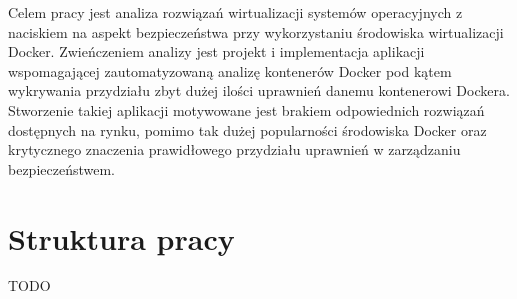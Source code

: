Celem pracy jest analiza rozwiązań wirtualizacji systemów operacyjnych z naciskiem na aspekt bezpieczeństwa przy wykorzystaniu środowiska wirtualizacji Docker. Zwieńczeniem analizy jest projekt i implementacja aplikacji wspomagającej zautomatyzowaną analizę kontenerów Docker pod kątem wykrywania przydziału zbyt dużej ilości uprawnień danemu kontenerowi Dockera. Stworzenie takiej aplikacji motywowane jest brakiem odpowiednich rozwiązań dostępnych na rynku, pomimo tak dużej popularności środowiska Docker oraz krytycznego znaczenia prawidłowego przydziału uprawnień w zarządzaniu bezpieczeństwem.

\section{Struktura pracy}

TODO